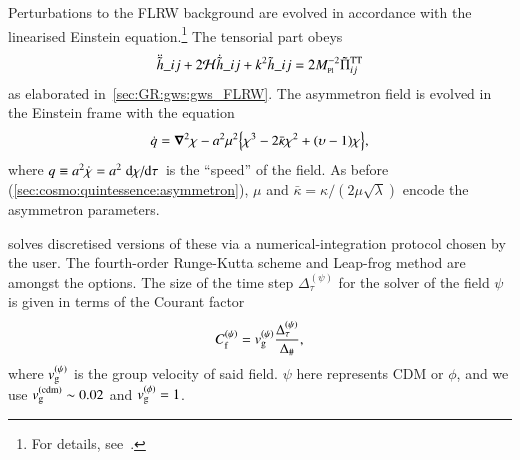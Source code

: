     Perturbations to the FLRW background are evolved in accordance with the linearised Einstein equation.\footnote{For details, see~\citet{adamekGevolutionCosmologicalNbody2016}.} %
    The tensorial part obeys 
    \begin{equation}
        \ddot{\Ft{h}}\_{ij} + 2\mathcal{H} \dot{\Ft{h}}\_{ij} + k^2 \Ft{h}\_{ij} =  2M\nped{Pl}^{-2} \Ft{\Pi}\indices*{^{\mathrm{TT}}_{ij}}
    \end{equation}
    as elaborated in~\cref{sec:GR:gws:gws_FLRW}. %
    The asymmetron field is evolved in the Einstein frame with the equation
    \begin{equation}
        \dot{q} = \boldsymbol{\nabla}^2 \chi - a^2 \mu^2 {\left\{ \chi^3 - 2\bar{\kappa} \chi^2 + (\upsilon-1) \chi \right\}},
    \end{equation}
    where $q\equiv a^2 \dot{\chi}=a^2 \dv*{\chi}{\tau}$ is the ``speed'' of the field. As before (\cref{sec:cosmo:quintessence:asymmetron}), $\mu$ and $\bar{\kappa}=\kappa /(2\mu\sqrt{\lambda})$ encode the asymmetron parameters. 



    \gwasevolution{} solves discretised versions of these via a numerical-integration protocol chosen by the user. The fourth-order Runge-Kutta scheme and Leap-frog method are amongst the options. %
    The size of the time step $\Delta_\tau^{(\psi)}$ for the solver of the field $\psi$ is given in terms of the Courant factor~\citep{christiansenAsimulationDomainFormation2024}
    \begin{equation}
        C_\mathrm{f}^{(\psi)} = v_\mathrm{g}^{(\psi)} \frac{\Delta_\tau^{(\psi)}}{\Delta_\#},
    \end{equation}
    where $ v_\mathrm{g}^{(\psi)}$ is the group velocity of said field. $\psi$ here represents CDM or $\phi$, and we use $v_\mathrm{g}^\mathrm{(cdm)}\sim 0.02$ and $v_\mathrm{g}^{(\phi)}= 1$. 













